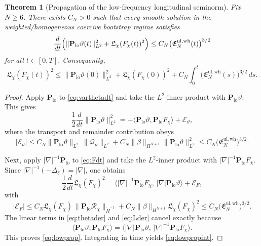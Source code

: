 \documentclass[11pt]{article}
\newtheorem{theorem}{Theorem}
\begin{document}
\begin{theorem}[Propagation of the low-frequency longitudinal seminorm]
\label{thm:lowprop}
Fix \(N\ge 6\). There exists \(C_N>0\) such that every smooth solution in the weighted/homogeneous coercive bootstrap regime satisfies
\begin{equation}
\frac{d}{dt}
\Bigl(
\|\mathbf P_{\mathrm{lo}}\vartheta(t)\|_{L^2}^2
+ \mathfrak L_\chi(F_\chi(t))^2
\Bigr)
\le
C_N\bigl(\mathfrak E_N^{\mathrm{ul,wh}}(t)\bigr)^{3/2}
\label{eq:lowprop}
\end{equation}
for all \(t\in[0,T]\). Consequently,
\begin{equation}
\mathfrak L_\chi(F_\chi(t))^2
\le
\|\mathbf P_{\mathrm{lo}}\vartheta(0)\|_{L^2}^2
+ \mathfrak L_\chi(F_\chi(0))^2
+ C_N\int_0^t
\bigl(\mathfrak E_N^{\mathrm{ul,wh}}(s)\bigr)^{3/2}\,ds.
\label{eq:lowpropint}
\end{equation}
\end{theorem}

\begin{proof}
Apply \(\mathbf P_{\mathrm{lo}}\) to \eqref{eq:varthetadt} and take the \(L^2\)-inner product with \(\mathbf P_{\mathrm{lo}}\vartheta\). This gives
\begin{equation}
\frac12\frac{d}{dt}\|\mathbf P_{\mathrm{lo}}\vartheta\|_{L^2}^2
=
-\langle \mathbf P_{\mathrm{lo}}\vartheta,\mathbf P_{\mathrm{lo}}F_\chi\rangle
+ \mathcal E_\vartheta,
\label{eq:thetader}
\end{equation}
where the transport and remainder contribution obeys
\[
|\mathcal E_\vartheta|
\le
C_N\|\mathbf P_{\mathrm{lo}}\vartheta\|_{L^2}\,
\|\mathcal Q_\vartheta\|_{L^2}
+ C_N\|\beta\|_{H^{N+1}}\|\mathbf P_{\mathrm{lo}}\vartheta\|_{L^2}^2
\le
C_N\bigl(\mathfrak E_N^{\mathrm{ul,wh}}\bigr)^{3/2}.
\]

Next, apply \(|\nabla|^{-1}\mathbf P_{\mathrm{lo}}\) to \eqref{eq:Fdt} and take the \(L^2\)-inner product with \(|\nabla|^{-1}\mathbf P_{\mathrm{lo}}F_\chi\). Since \(|\nabla|^{-1}(-\Delta_\delta)=|\nabla|\), one obtains
\begin{equation}
\frac12\frac{d}{dt}\mathfrak L_\chi(F_\chi)^2
=
\langle |\nabla|^{-1}\mathbf P_{\mathrm{lo}}F_\chi,\,
|\nabla|\mathbf P_{\mathrm{lo}}\vartheta\rangle
+ \mathcal E_F,
\label{eq:Lder}
\end{equation}
with
\[
|\mathcal E_F|
\le
C_N\mathfrak L_\chi(F_\chi)\,
\|\mathbf P_{\mathrm{lo}}\mathcal R_\chi\|_{\dot H^{-1}}
+ C_N\|\beta\|_{H^{N+1}}\mathfrak L_\chi(F_\chi)^2
\le
C_N\bigl(\mathfrak E_N^{\mathrm{ul,wh}}\bigr)^{3/2}.
\]
The linear terms in \eqref{eq:thetader} and \eqref{eq:Lder} cancel exactly because
\[
\langle \mathbf P_{\mathrm{lo}}\vartheta,\mathbf P_{\mathrm{lo}}F_\chi\rangle
=
\langle |\nabla|\mathbf P_{\mathrm{lo}}\vartheta,\,
|\nabla|^{-1}\mathbf P_{\mathrm{lo}}F_\chi\rangle.
\]
This proves \eqref{eq:lowprop}. Integrating in time yields \eqref{eq:lowpropint}.
\end{proof}
\end{document}
